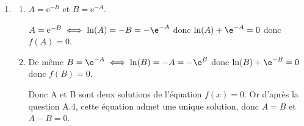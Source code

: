 \begin{enumerate}
\begin{enumerate}
\textit{Initialisation :} $a_0=\dfrac{1}{10}$ \quad $a_1=\e^{-1}=\dfrac{1}{\e}$ \quad $b_0=1=\e^0$  \quad $b_1=\e^{-\frac{1}{10}}$.

La fonction $x\mapsto\e^x$ est strictement croissante sur $\R$ et  $-1\leqslant -\dfrac{1}{10} \leqslant 0$ donc ,  $\e^{-1}\leqslant \e^{-\frac{1}{10}} \leqslant \e^0$ et $\dfrac{1}{\e}>\dfrac{1}{10}$ donc  on peut alors affirmer que $0<a_0 \leqslant a_1 \leqslant b_1 \leqslant b_0 \leqslant1$.

L'initialisation est vérifiée.

\textit{Hérédité :} Soit  $n \in \N^*$, et supposons que $0 < a_n \leqslant a_{n+1} \leqslant b_{n+1} \leqslant b_n \leqslant 1$.
		
Montrons que $0 < a_{n+1} \leqslant a_{n+2} \leqslant b_{n+2} \leqslant b_{n+1} \leqslant 1$.
					
La fonction $x \longmapsto \text{e}^{-x}$ est décroissante sur $\R$. Donc 
			
$0 < a_n \leqslant a_{n+1} \leqslant b_{n+1} \leqslant b_n \leqslant 1 \iff \e^{-0} >\e^{-a_n }\geqslant \e^{-a_{n+1}}\geqslant \e^{-b_{n+1}} \geqslant \e^{-b_n} \geqslant \e^{-1} $
			
soit $0< \e^{-1} \leqslant \e^{-b_n} \leqslant \e^{-b_{n+1}} \leqslant \e^{-a_{n+1}} \leqslant \e^{-a_n } < 1 \leqslant 1$ donc

$0 < a_{n+1} \leqslant a_{n+2} \leqslant b_{n+2} \leqslant b_{n+1} \leqslant 1$. On obtient ce qu'il fallait démontrer.
			
L'hérédité est démontrée.
					
\textit{Conclusion : } La proposition est vraie au rang $0$ et si elle est vraie au rang $n$, elle l'est aussi au rang $n + 1$.	D'après l'axiome de récurrence, $\forall n \in \N$, $0 < a_n \leqslant a_{n+1} \leqslant b_{n+1} \leqslant b_n \leqslant 1$.
			\item Nous venons de montrer que $\forall n \in \N$, $0<a_n\leqslant a_{n+1} \leqslant1$ et que $0 \leqslant b_{n+1} \leqslant b_n  \leqslant 1$.
			
			La suite $(a_n)$ est croissante et majorée par 1. D'après  le théorème de convergence monotone, la suite $(a_n)$ converge.
			
			De même, la suite $(b_n)$ est décroissante et minorée par 0. D'après  le théorème de convergence monotone, la suite $(b_n)$ converge.
\end{enumerate}
\item 
	\begin{enumerate}
		\item $A = \text{e}^{-B}$ et $B = \text{e}^{-A}$.

		$A = \text{e}^{-B} \iff \ln(A)=-B=-\e^{-A}$ donc $\ln(A)+\e^{-A}=0$ donc $f(A)=0$.

		\item De même $B = \e^{-A}\iff \ln(B)=-A=-\e^{B}$ donc $\ln(B)+\e^{-B}=0$ donc $f(B)=0$.

Donc A et B sont deux solutions de l'équation $f(x)=0$. Or d'après la question A.4, cette équation admet une unique solution, donc $A= B$ et $A - B = 0$.
	\end{enumerate}
\end{enumerate}
